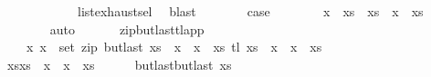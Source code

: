 \begin{isabellebody}
\ \ \ \ \ \ \ \ \ \ \ \ list{\isachardot}{\kern0pt}exhaust{\isacharunderscore}{\kern0pt}sel\ \isamarkupfalse%
\ blast\isanewline
\ \ \ \ \isamarkupfalse%
\ \isamarkupfalse%
\ {\isacharquery}{\kern0pt}case\isanewline
\ \ \ \ \ \ \isamarkupfalse%
\ {\isacartoucheopen}x\ {\isacharhash}{\kern0pt}\ xs\ {\isacharequal}{\kern0pt}\ xs\ {\isacharat}{\kern0pt}\ x\ {\isacharhash}{\kern0pt}\ xs\isanewline
\ \ \ \ \ \ \isamarkupfalse%
\ auto\isanewline
\ \ \isamarkupfalse%
%
\endisatagproof
{\isafoldproof}%
%
\isadelimproof
\isanewline
%
\endisadelimproof
\isanewline
\ \ \isamarkupfalse%
\ zip{\isacharunderscore}{\kern0pt}butlast{\isacharunderscore}{\kern0pt}tl{\isacharunderscore}{\kern0pt}app{}{\isacharcolon}{\kern0pt}\ \isanewline
\ \ \ \ {\isachardoublequoteopen}{\isacharparenleft}{\kern0pt}x\ x\ {\isasymin}\ set\ {\isacharparenleft}{\kern0pt}zip\ {\isacharparenleft}{\kern0pt}butlast\ {\isacharparenleft}{\kern0pt}xs\ {\isacharat}{\kern0pt}\ x\ {\isacharhash}{\kern0pt}\ x\ {\isacharhash}{\kern0pt}\ xs\ {\isacharparenleft}{\kern0pt}tl\ {\isacharparenleft}{\kern0pt}xs\ {\isacharat}{\kern0pt}\ x\ {\isacharhash}{\kern0pt}\ x\ {\isacharhash}{\kern0pt}\ xs\ \isanewline
%
\isadelimproof
\ \ %
\endisadelimproof
%
\isatagproof
{}\isamarkupfalse%
\ {\isacharminus}{\kern0pt}\isanewline
\ \ \ \ \isamarkupfalse%
\ {\isacharquery}{\kern0pt}xs{\isacharequal}{\kern0pt}{\isachardoublequoteopen}xs\ {\isacharat}{\kern0pt}\ x\ {\isacharhash}{\kern0pt}\ x\ {\isacharhash}{\kern0pt}\ xs\isanewline
\ \ \ \ \isamarkupfalse%
\ {\isacharquery}{\kern0pt}butlast{\isacharequal}{\kern0pt}{\isachardoublequoteopen}butlast\ {\isacharquery}{\kern0pt}xs{\isachardoublequoteclose}\isanewline
\ \ \ \ \isamarkupfalse%

\end{isabellebody}
